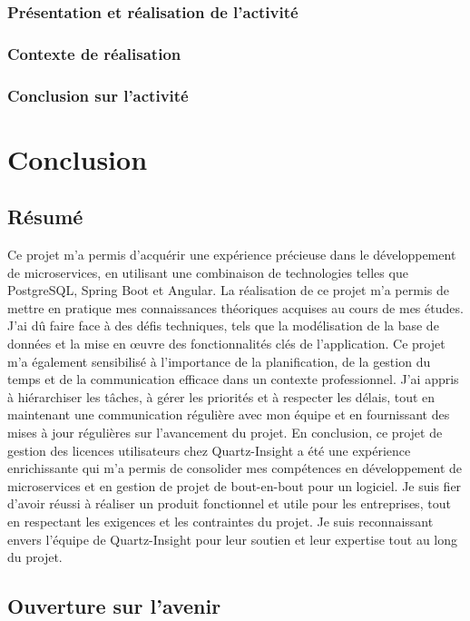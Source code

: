 \documentclass[a4paper, 11pt]{report}
\begin{document}
\subsection{Présentation et réalisation de l'activité}
\subsection{Contexte de réalisation}
\subsection{Conclusion sur l'activité}

\chapter{Conclusion}

\section{Résumé}
Ce projet m'a permis d'acquérir une expérience précieuse dans le dévelop\-pement de microservices, en utilisant une combinaison de technologies telles que PostgreSQL, Spring Boot et Angular.
La réalisation de ce projet m'a permis de mettre en pratique mes connaissances théoriques acquises au cours de mes études.
J'ai dû faire face à des défis techniques, tels que la modélisation de la base de données et la mise en œuvre des fonctionnalités clés de l'application.
Ce projet m'a également sensibilisé à l'importance de la planification, de la gestion du temps et de la communication efficace dans un contexte professionnel.
J'ai appris à hiérarchiser les tâches, à gérer les priorités et à respecter les délais, tout en maintenant une communication régulière avec mon équipe et en fournissant des mises à jour régulières sur l'avancement du projet.
\newline
\newline
En conclusion, ce projet de gestion des licences utilisateurs chez Quartz-Insight a été une expérience enrichissante qui m'a permis de consolider mes compétences en développement de microservices et en gestion de projet de bout-en-bout pour un logiciel.
Je suis fier d'avoir réussi à réaliser un produit fonctionnel et utile pour les entreprises, tout en respectant les exigences et les contraintes du projet.
Je suis reconnaissant envers l'équipe de Quartz-Insight pour leur soutien et leur expertise tout au long du projet.
\section{Ouverture sur l'avenir}
\end{document}
